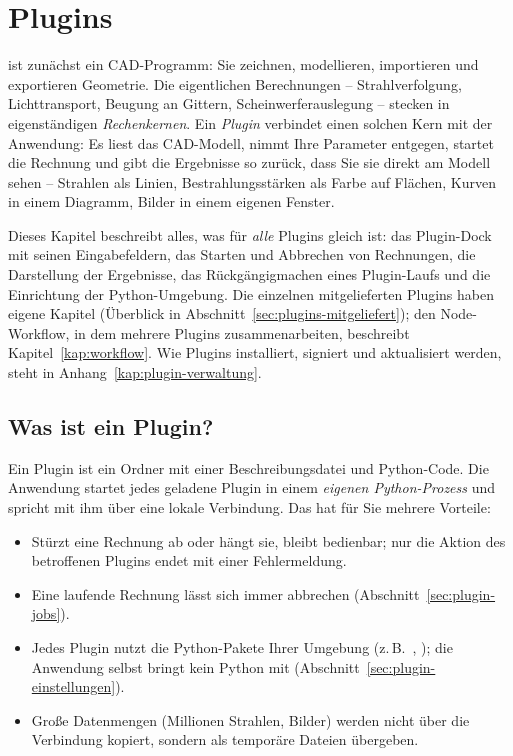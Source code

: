 \chapter{Plugins}\label{kap:plugins}

\produkt{} ist zunächst ein CAD-Programm: Sie zeichnen, modellieren, importieren und
exportieren Geometrie. Die eigentlichen Berechnungen – Strahlverfolgung, Lichttransport,
Beugung an Gittern, Scheinwerferauslegung – stecken in eigenständigen
\emph{Rechenkernen}. Ein \emph{Plugin} verbindet einen solchen
Kern mit der Anwendung: Es liest das CAD-Modell, nimmt Ihre Parameter entgegen, startet die
Rechnung und gibt die Ergebnisse so zurück, dass Sie sie direkt am Modell sehen – Strahlen als
Linien, Bestrahlungsstärken als Farbe auf Flächen, Kurven in einem Diagramm, Bilder in einem
eigenen Fenster.

Dieses Kapitel beschreibt alles, was für \emph{alle} Plugins gleich ist: das Plugin-Dock mit
seinen Eingabefeldern, das Starten und Abbrechen von Rechnungen, die Darstellung der
Ergebnisse, das Rückgängigmachen eines Plugin-Laufs und die Einrichtung der
Python-Umgebung. Die einzelnen mitgelieferten Plugins haben eigene Kapitel (Überblick in
Abschnitt~\ref{sec:plugins-mitgeliefert}); den Node-Workflow, in dem mehrere Plugins
zusammenarbeiten, beschreibt Kapitel~\ref{kap:workflow}. Wie Plugins installiert, signiert und
aktualisiert werden, steht in Anhang~\ref{kap:plugin-verwaltung}.

\section{Was ist ein Plugin?}\label{sec:plugins-konzept}

Ein Plugin ist ein Ordner mit einer Beschreibungsdatei  und Python-Code.
Die Anwendung startet jedes geladene Plugin in einem \emph{eigenen Python-Prozess}
 und spricht mit ihm über eine lokale Verbindung. Das hat für Sie
mehrere Vorteile:

\begin{itemize}
  \item Stürzt eine Rechnung ab oder hängt sie, bleibt \produkt{} bedienbar; nur die Aktion
        des betroffenen Plugins endet mit einer Fehlermeldung.
  \item Eine laufende Rechnung lässt sich immer abbrechen (Abschnitt~\ref{sec:plugin-jobs}).
  \item Jedes Plugin nutzt die Python-Pakete Ihrer Umgebung (z.\,B.\ ,
        ); die Anwendung selbst bringt kein Python mit
        (Abschnitt~\ref{sec:plugin-einstellungen}).
  \item Große Datenmengen (Millionen Strahlen, Bilder) werden nicht über die Verbindung
        kopiert, sondern als temporäre Dateien übergeben.
\end{itemize}

